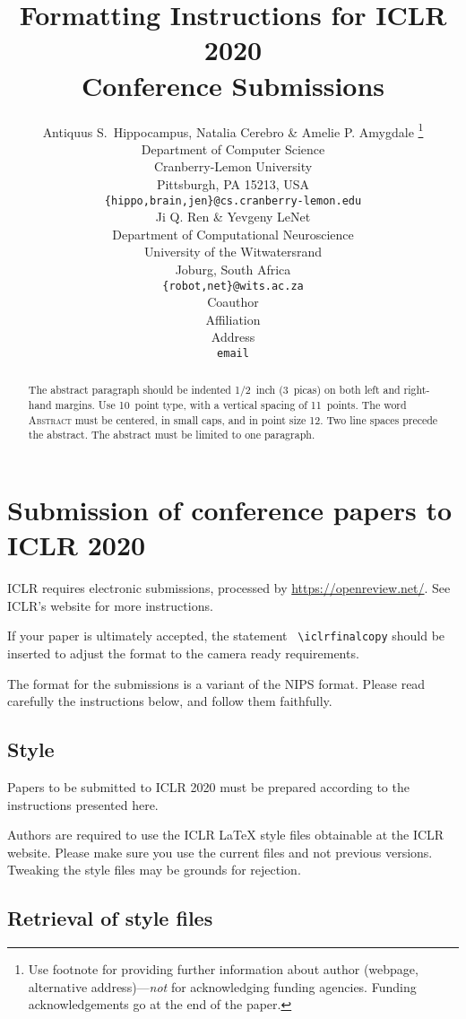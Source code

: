 \documentclass{article} %
\title{Formatting Instructions for ICLR 2020 \\ Conference Submissions}
\author{Antiquus S.~Hippocampus, Natalia Cerebro \& Amelie P. Amygdale \thanks{ Use footnote for providing further information
about author (webpage, alternative address)---\emph{not} for acknowledging
funding agencies.  Funding acknowledgements go at the end of the paper.} \\
Department of Computer Science\\
Cranberry-Lemon University\\
Pittsburgh, PA 15213, USA \\
\texttt{\{hippo,brain,jen\}@cs.cranberry-lemon.edu} \\
\And
Ji Q. Ren \& Yevgeny LeNet \\
Department of Computational Neuroscience \\
University of the Witwatersrand \\
Joburg, South Africa \\
\texttt{\{robot,net\}@wits.ac.za} \\
\AND
Coauthor \\
Affiliation \\
Address \\
\texttt{email}
}
\begin{document}
\maketitle

\begin{abstract}
The abstract paragraph should be indented 1/2~inch (3~picas) on both left and
right-hand margins. Use 10~point type, with a vertical spacing of 11~points.
The word \textsc{Abstract} must be centered, in small caps, and in point size 12. Two
line spaces precede the abstract. The abstract must be limited to one
paragraph.
\end{abstract}

\section{Submission of conference papers to ICLR 2020}

ICLR requires electronic submissions, processed by
\url{https://openreview.net/}. See ICLR's website for more instructions.

If your paper is ultimately accepted, the statement {\tt
  {\textbackslash}iclrfinalcopy} should be inserted to adjust the
format to the camera ready requirements.

The format for the submissions is a variant of the NIPS format.
Please read carefully the instructions below, and follow them
faithfully.

\subsection{Style}

Papers to be submitted to ICLR 2020 must be prepared according to the
instructions presented here.


Authors are required to use the ICLR \LaTeX{} style files obtainable at the
ICLR website. Please make sure you use the current files and
not previous versions. Tweaking the style files may be grounds for rejection.

\subsection{Retrieval of style files}
\end{document}
